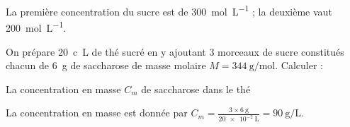 
\begin{corrige}
La première concentration du sucre est de \SI{300}{\mol\per\liter} ; la deuxième vaut \SI{200}{\mol\per\liter}.
\end{corrige}


\finEntrainement





\hauteurLargeurCadreReponse		{7mm}{4cm}
\initialisationEntrainement

\debutEntrainement

On prépare \SI{20}{c\liter} de thé sucré en y ajoutant $3$ morceaux de sucre constitués chacun de \SI{6}{\gram} de saccharose de masse molaire $M=\SI{344}{\gram\per\mol}$. Calculer : 




\begin{enonce}
La concentration en masse $C_m$ de saccharose dans le thé
\end{enonce}


\begin{corrige}
La concentration en masse est donnée par $C_m=\frac{3\times \SI{6}{\gram}}{\SI{20e-2}{\liter}}=\SI{90}{\gram\per\liter}$.
\end{corrige}

